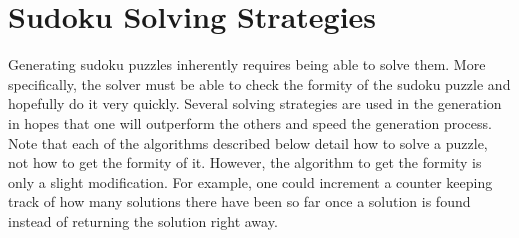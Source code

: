 
\section{Sudoku Solving Strategies}

    Generating sudoku puzzles inherently requires being able to solve them. More specifically, the solver must be able to
    check the formity of the sudoku puzzle and hopefully do it very quickly. Several solving strategies are used in the generation
    in hopes that one will outperform the others and speed the generation process. Note that each of the algorithms described below
    detail how to solve a puzzle, not how to get the formity of it. However, the algorithm to get the formity is only a slight
    modification. For example, one could increment a counter keeping track of how many solutions there have been so far once
    a solution is found instead of returning the solution right away.

